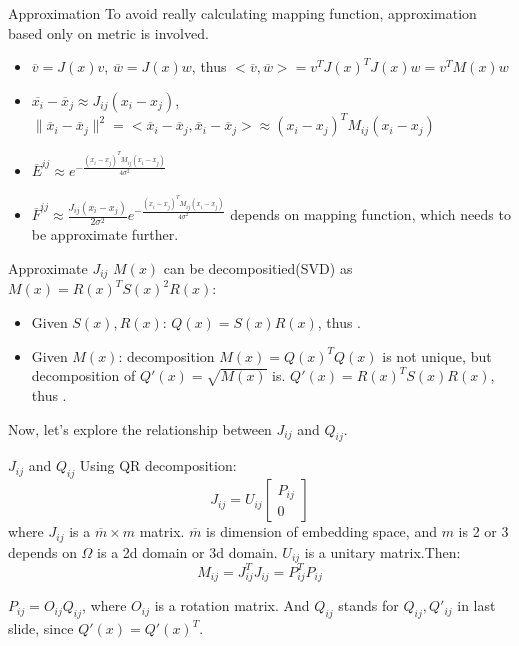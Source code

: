 \documentclass{beamer}
\begin{document}
\begin{frame}{Approximation}
To avoid really calculating mapping function, approximation based only on metric is involved.
\begin{itemize}
\item $\overline{v}=J(x)v$, $\overline{w}=J(x)w$, thus $<\overline{v},\overline{w}>=v^TJ(x)^TJ(x)w=v^TM(x)w$
\item $\overline{x_i}-\overline{x}_j\approx J_{ij}(x_i-x_j)$, $\|\overline{x}_i-\overline{x}_j\|^2=<\overline{x}_i-\overline{x}_j, \overline{x}_i-\overline{x}_j>\approx (x_i-x_j)^TM_{ij}(x_i-x_j)$  
\item $\overline{E}^{ij}\approx e^{-\frac{(x_i-x_j)^TM_{ij}(x_i-x_j)}{4\sigma^2}}$
\item $\overline{F}^{ij}\approx \frac{J_{ij}(x_i-x_j)}{2\sigma^2}e^{-\frac{(x_i-x_j)^T M_{ij}(x_i-x_j)}{4\sigma^2}}$  depends on mapping function, which needs to be approximate further.
\end{itemize}
\end{frame}

\begin{frame}{Approximate $J_{ij}$}
$M(x)$ can be decompositied(SVD) as $M(x)=R(x)^TS(x)^2R(x)$:
\begin{itemize}
\item Given $S(x),R(x)$: \quad $Q(x)=S(x)R(x)$, thus .
\item Given $M(x)$: \quad decomposition $M(x)=Q(x)^TQ(x)$ is not unique, but decomposition of $Q'(x)=\sqrt{M(x)}$ is. $Q'(x)=R(x)^TS(x)R(x)$, thus .
\end{itemize}

Now, let's explore the relationship between $J_{ij}$ and $Q_{ij}$.
\end{frame}

\begin{frame}{$J_{ij}$ and $Q_{ij}$}
Using QR decomposition:
\[J_{ij} = U_{ij}\left [ \begin{array}{cc} P_{ij} \\ 0\end{array} \right ]\]
where $J_{ij}$ is a $\overline{m}\times m$ matrix. $\overline{m}$ is dimension of embedding space, and $m$ is 2 or 3 depends on $\Omega$ is a 2d domain or 3d domain. $U_{ij}$ is a unitary matrix.Then:
\[M_{ij}=J_{ij}^TJ_{ij}=P_{ij}^TP_{ij}\]

$P_{ij}=O_{ij}Q_{ij}$, where $O_{ij}$ is a rotation matrix. And $Q_{ij}$ stands for $Q_{ij},Q'_{ij}$ in last slide, since $Q'(x)=Q'(x)^T$.
\end{frame}
\end{document}
